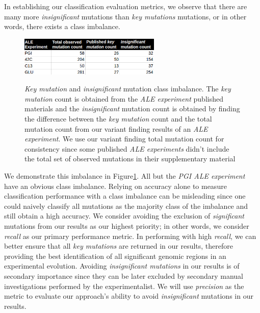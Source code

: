 \documentclass[12pt,final,masters,chapterheads]{ucsd}  %
\begin{document}
In establishing our classification evaluation metrics, we observe that there are many more \textit{insignificant} mutations than \textit{key mutations} mutations, or in other words, there exists a class imbalance.

\begin{figure}[H]
  \caption{\textit{Key mutation} and \textit{insignificant} mutation class imbalance. The \textit{key mutation} count is obtained from the \textit{ALE experiment} published materials and the \textit{insignificant} mutation count is obtained by finding the difference between the \textit{key mutation} count and the total mutation count from our variant finding results of an \textit{ALE experiment}. We use our variant finding total mutation count for consistency since some published \textit{ALE experiments} didn't include the total set of observed mutations in their supplementary material}
  \centering
  \includegraphics[width=0.6\textwidth]{class_imbalance_table.png}
  \label{fig:class_imbalance_table}
\end{figure}

We demonstrate this imbalance in Figure\ref{fig:class_imbalance_table}. All but the \textit{PGI ALE experiment} have an obvious class imbalance. Relying on accuracy alone to measure classification performance with a class imbalance can be misleading since one could naively classify all mutations as the majority class of the imbalance and still obtain a high accuracy. We consider avoiding the exclusion of \textit{significant} mutations from our results as our highest priority; in other words, we consider \textit{recall} as our primary performance metric. In performing with high \textit{recall}, we can better ensure that all \textit{key mutations} are returned in our results, therefore providing the best identification of all significant genomic regions in an experimental evolution. Avoiding \textit{insignificant mutations} in our results is of secondary importance since they can be later excluded by secondary manual investigations performed by the experimentalist. We will use \textit{precision} as the metric to evaluate our approach's ability to avoid \textit{insignificant} mutations in our results.
\end{document}
